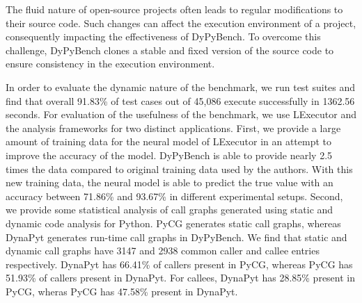 The fluid nature of open-source projects often leads to regular modifications to their source code.
Such changes can affect the execution environment of a project, consequently impacting the effectiveness of DyPyBench.
To overcome this challenge, DyPyBench clones a stable and fixed version of the source code to ensure consistency in the execution environment.

In order to evaluate the dynamic nature of the benchmark, we run test suites and find that overall 91.83\% of test cases out of 45,086 execute successfully in 1362.56 seconds.
For evaluation of the usefulness of the benchmark, we use LExecutor and the analysis frameworks for two distinct applications.
First, we provide a large amount of training data for the neural model of LExecutor in an attempt to improve the accuracy of the model.
DyPyBench is able to provide nearly 2.5 times the data compared to original training data used by the authors.
With this new training data, the neural model is able to predict the true value with an accuracy between 71.86\% and 93.67\% in different experimental setups.
Second, we provide some statistical analysis of call graphs generated using static and dynamic code analysis for Python.
PyCG generates static call graphs, whereas DynaPyt generates run-time call graphs in DyPyBench.
We find that static and dynamic call graphs have 3147 and 2938 common caller and callee entries respectively.
DynaPyt has 66.41\% of callers present in PyCG, whereas PyCG has 51.93\% of callers present in DynaPyt.
For callees, DynaPyt has 28.85\% present in PyCG, wheras PyCG has 47.58\% present in DynaPyt.



